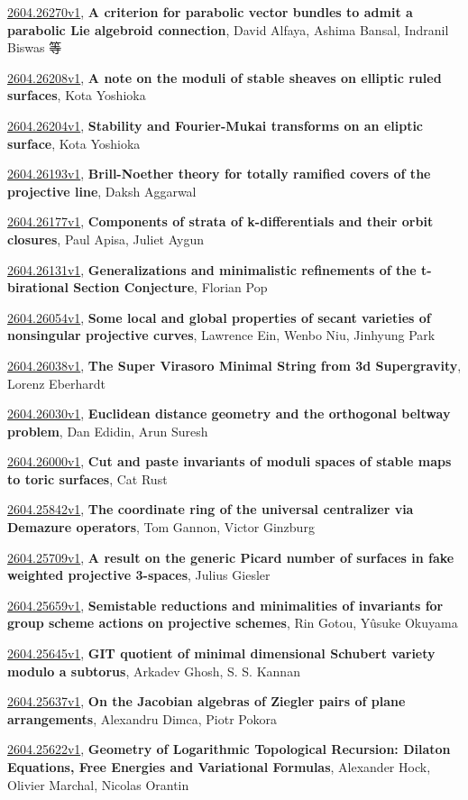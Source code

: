 \documentclass[9pt, a4paper]{article}
\theoremstyle{plain}
\theoremstyle{definition}
\theoremstyle{remark}
\newcommand{\arxiv}[3]{\href{https://arxiv.org/abs/#1}{#1}, \textbf{\textcolor{arxivblue}{#2}}, #3}
\begin{document}
\arxiv{2604.26270v1}{A criterion for parabolic vector bundles to admit a parabolic Lie algebroid connection}{David Alfaya, Ashima Bansal, Indranil Biswas 等}

\arxiv{2604.26208v1}{A note on the moduli of stable sheaves on elliptic ruled surfaces}{Kota Yoshioka}

\arxiv{2604.26204v1}{Stability and Fourier-Mukai transforms on an eliptic surface}{Kota Yoshioka}

\arxiv{2604.26193v1}{Brill-Noether theory for totally ramified covers of the projective line}{Daksh Aggarwal}

\arxiv{2604.26177v1}{Components of strata of k-differentials and their orbit closures}{Paul Apisa, Juliet Aygun}

\arxiv{2604.26131v1}{Generalizations and minimalistic refinements of the t-birational Section Conjecture}{Florian Pop}

\arxiv{2604.26054v1}{Some local and global properties of secant varieties of nonsingular projective curves}{Lawrence Ein, Wenbo Niu, Jinhyung Park}

\arxiv{2604.26038v1}{The Super Virasoro Minimal String from 3d Supergravity}{Lorenz Eberhardt}

\arxiv{2604.26030v1}{Euclidean distance geometry and the orthogonal beltway problem}{Dan Edidin, Arun Suresh}

\arxiv{2604.26000v1}{Cut and paste invariants of moduli spaces of stable maps to toric surfaces}{Cat Rust}

\arxiv{2604.25842v1}{The coordinate ring of the universal centralizer via Demazure operators}{Tom Gannon, Victor Ginzburg}

\arxiv{2604.25709v1}{A result on the generic Picard number of surfaces in fake weighted projective 3-spaces}{Julius Giesler}

\arxiv{2604.25659v1}{Semistable reductions and minimalities of invariants for group scheme actions on projective schemes}{Rin Gotou, Yûsuke Okuyama}

\arxiv{2604.25645v1}{GIT quotient of minimal dimensional Schubert variety modulo a subtorus}{Arkadev Ghosh, S. S. Kannan}

\arxiv{2604.25637v1}{On the Jacobian algebras of Ziegler pairs of plane arrangements}{Alexandru Dimca, Piotr Pokora}

\arxiv{2604.25622v1}{Geometry of Logarithmic Topological Recursion: Dilaton Equations, Free Energies and Variational Formulas}{Alexander Hock, Olivier Marchal, Nicolas Orantin}
\end{document}
